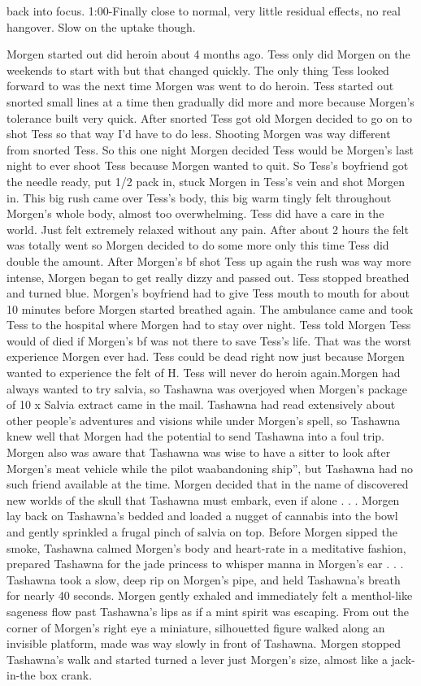 \documentclass[12pt]{book}
\begin{document}
back into focus. 1:00-Finally close to normal, very little residual effects, no real hangover. Slow on the uptake though.



Morgen started out did heroin about 4 months ago. Tess only did Morgen on the weekends to start with but that changed quickly. The only thing Tess looked forward to was the next time Morgen was went to do heroin. Tess started out snorted small lines at a time then gradually did more and more because Morgen's tolerance built very quick. After snorted Tess got old Morgen decided to go on to shot Tess so that way I'd have to do less. Shooting Morgen was way different from snorted Tess. So this one night Morgen decided Tess would be Morgen's last night to ever shoot Tess because Morgen wanted to quit. So Tess's boyfriend got the needle ready, put 1/2 pack in, stuck Morgen in Tess's vein and shot Morgen in. This big rush came over Tess's body, this big warm tingly felt throughout Morgen's whole body, almost too overwhelming. Tess did have a care in the world. Just felt extremely relaxed without any pain. After about 2 hours the felt was totally went so Morgen decided to do some more only this time Tess did double the amount. After Morgen's bf shot Tess up again the rush was way more intense, Morgen began to get really dizzy and passed out. Tess stopped breathed and turned blue. Morgen's boyfriend had to give Tess mouth to mouth for about 10 minutes before Morgen started breathed again. The ambulance came and took Tess to the hospital where Morgen had to stay over night. Tess told Morgen Tess would of died if Morgen's bf was not there to save Tess's life. That was the worst experience Morgen ever had. Tess could be dead right now just because Morgen wanted to experience the felt of H. Tess will never do heroin again.Morgen had always wanted to try salvia, so Tashawna was overjoyed when Morgen's package of 10 x Salvia extract came in the mail. Tashawna had read extensively about other people's adventures and visions while under Morgen's spell, so Tashawna knew well that Morgen had the potential to send Tashawna into a foul trip. Morgen also was aware that Tashawna was wise to have a sitter to look after Morgen's meat vehicle while the pilot waabandoning ship'', but Tashawna had no such friend available at the time. Morgen decided that in the name of discovered new worlds of the skull that Tashawna must embark, even if alone . . .  Morgen lay back on Tashawna's bedded and loaded a nugget of cannabis into the bowl and gently sprinkled a frugal pinch of salvia on top. Before Morgen sipped the smoke, Tashawna calmed Morgen's body and heart-rate in a meditative fashion, prepared Tashawna for the jade princess to whisper manna in Morgen's ear . . .  Tashawna took a slow, deep rip on Morgen's pipe, and held Tashawna's breath for nearly 40 seconds. Morgen gently exhaled and immediately felt a menthol-like sageness flow past Tashawna's lips as if a mint spirit was escaping. From out the corner of Morgen's right eye a miniature, silhouetted figure walked along an invisible platform, made was way slowly in front of Tashawna. Morgen stopped Tashawna's walk and started turned a lever just Morgen's size, almost like a jack-in-the box crank. 
\end{document}

